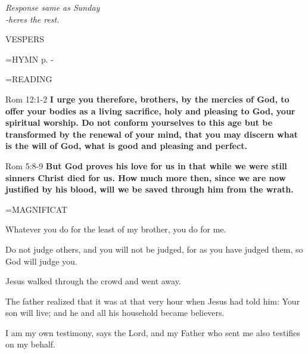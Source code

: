 \begin{center}
\textit{Response same as Sunday\\
-heres the rest.}
\end{center}

\begin{flushleft}\normalsize VESPERS\\\end{flushleft}

\hangindent=\parindent \small{\uppercase{HYMN} p. \pageref{lent:firstHymn}-\pageref{lent:lastHymn}\\}

\hangindent=\parindent \small READING
\begin{description}[labelindent=\parindent, leftmargin=*]
\item [Weeks 1-4:]      Rom 12:1-2 \textbf{     I urge you therefore, brothers, by the mercies of God, to offer your bodies as a living sacrifice, holy and pleasing to God, your spiritual worship. Do not conform yourselves to this age but be transformed by the renewal of your mind, that you may discern what is the will of God, what is good and pleasing and perfect.\\}
\item [Week 5:]      Rom 5:8-9 \textbf{     But God proves his love for us in that while we were still sinners Christ died for us. How much more then, since we are now justified by his blood, will we be saved through him from the wrath.\\}
\end{description}

\hangindent=\parindent \small MAGNIFICAT
\begin{description}[labelindent=\parindent, leftmargin=*]
\item [Week 1:] 	Whatever you do for the least of my brother, you do for me.
\item [Week 2:] 	Do not judge others, and you will not be judged, for as you have judged them, so God will judge you.
\item [Week 3:] 	Jesus walked through the crowd and went away.
\item [Week 4:] 	The father realized that it was at that very hour when Jesus had told him: Your son will live; and he and all his household became believers.
\item [Week 5:] 	I am my own testimony, says the Lord, and my Father who sent me also testifies on my behalf.
\end{description}
